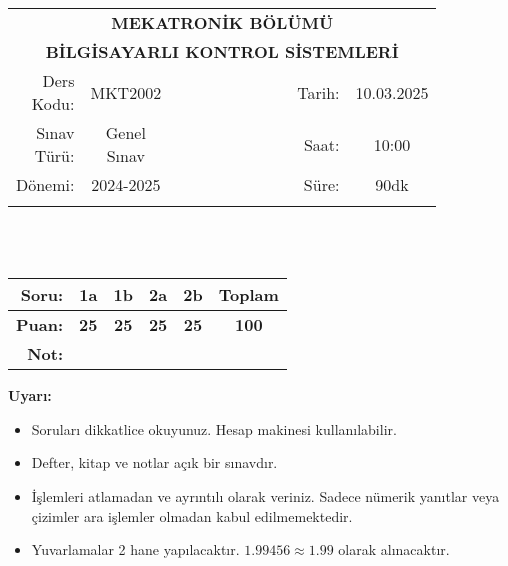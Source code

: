 \newcommand\UniversiteAdi{Niğde Ömer Halisdemir Üniversitesi}
\newcommand\BolumAdi{MEKATRONİK BÖLÜMÜ}
\newcommand\DersKodu{MKT2002}
\newcommand\DersAdi{BİLGİSAYARLI KONTROL SİSTEMLERİ}
\newcommand\SinavAdi{Genel Sınav}
\newcommand\SinavTarihi{10.03.2025}
\newcommand\SinavSaati{10:00}
\newcommand\SinavSuresi{90dk}

\pagestyle{fancy}
\fancyhf{} %
\noindent
\begin{tabular}{
    p{0.15\linewidth}
    p{0.15\linewidth}
    p{0.3\linewidth}
    p{0.1\linewidth}
    p{0.15\linewidth}}
    \multicolumn{5}{c}{\textbf{\BolumAdi}}\\
    \multicolumn{5}{c}{\textbf{\DersAdi}}\\\hline
    \multicolumn{1}{|r|}{Ders Kodu:}&
    \multicolumn{1}{|c|}{\DersKodu}&
    \multicolumn{1}{|c|}{}& 
    \multicolumn{1}{|r|}{Tarih:}&
    \multicolumn{1}{|c|}{\SinavTarihi} \\\hline
    \multicolumn{1}{|r|}{Sınav Türü:}&
    \multicolumn{1}{|c|}{\SinavAdi}&  
    \multicolumn{1}{|c|}{}&
    \multicolumn{1}{|r|}{Saat:}&
    \multicolumn{1}{|c|}{\SinavSaati}\\\hline
    \multicolumn{1}{|r|}{Dönemi:}&
    \multicolumn{1}{|c|}{2024-2025}&
    \multicolumn{1}{|c|}{}&
    \multicolumn{1}{|r|}{Süre:}&
    \multicolumn{1}{|c|}{\SinavSuresi} \\\hline
    &&&&\\
\end{tabular}\\\\
\noindent\begin{center}
\begin{tabular}{|r|c|c|c|c|c|}\hline
    \textbf{Soru:}&
    \textbf{1a}&
    \textbf{1b}&
    \textbf{2a}&
    \textbf{2b}&
    \textbf{Toplam}\\\hline
    \textbf{Puan:}&
    \textbf{25}&
    \textbf{25}&
    \textbf{25}&
    \textbf{25}&
    \textbf{100}\\\hline
    \textbf{Not:}&&&&&\\\hline
\end{tabular}\end{center}
\noindent\textbf{Uyarı:}
\begin{itemize}\bfseries
    \item Soruları dikkatlice okuyunuz. Hesap makinesi kullanılabilir.
    \item Defter, kitap ve notlar açık bir sınavdır.
    \item İşlemleri atlamadan ve ayrıntılı olarak veriniz. Sadece nümerik yanıtlar veya çizimler ara işlemler olmadan kabul edilmemektedir.
    \item Yuvarlamalar 2 hane yapılacaktır. $\mathbf{1.99456\approx1.99}$ olarak alınacaktır.
\end{itemize}

